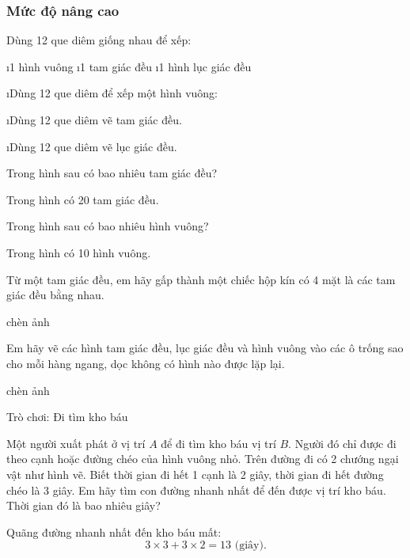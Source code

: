 \subsubsection{Mức độ nâng cao}
\begin{bt}
	Dùng 12 que diêm giống nhau để xếp:
	\begin{enumerate}[a), leftmargin=*]
		\i 1 hình vuông
		\i 1 tam giác đều
		\i 1 hình lục giác đều
	\end{enumerate}
	\begin{loigiaichuong34}
		\begin{enumerate}[a), leftmargin=*]
			\i Dùng 12 que diêm để xếp một hình vuông:
			
			\i Dùng 12 que diêm vẽ tam giác đều.
			
			\i Dùng 12 que diêm vẽ lục giác đều.
		\end{enumerate}
	\end{loigiaichuong34}
\end{bt}
\begin{bt}
	Trong hình sau có bao nhiêu tam giác đều?
	\begin{loigiaichuong34}
		Trong hình có 20 tam giác đều.
	\end{loigiaichuong34}
\end{bt}
\begin{bt}
	Trong hình sau có bao nhiêu hình vuông?
	\begin{loigiaichuong34}
		Trong hình có 10 hình vuông.
	\end{loigiaichuong34}
\end{bt}
\begin{bt}
	Từ một tam giác đều, em hãy gấp thành một chiếc hộp kín có 4 mặt là các tam giác đều bằng nhau.
	\begin{loigiaichuong34}
		chèn ảnh
	\end{loigiaichuong34}
\end{bt} 
\begin{bt}
	Em hãy vẽ các hình tam giác đều, lục giác đều và hình vuông vào các ô trống sao cho mỗi hàng ngang, dọc không có hình nào được lặp lại.
	\begin{loigiaichuong34}
		chèn ảnh
	\end{loigiaichuong34}
\end{bt}
\begin{bt}
	Trò chơi: Đi tìm kho báu
	
	Một người xuất phát ở vị trí $A$ để đi tìm kho báu vị trí $B$. Người đó chỉ được đi theo cạnh hoặc đường chéo của hình vuông nhỏ. Trên đường đi có 2 chướng ngại vật như hình vẽ. Biết thời gian đi hết 1 cạnh là 2 giây, thời gian đi hết đường chéo là 3 giây. Em hãy tìm con đường nhanh nhất để đến được vị trí kho báu. Thời gian đó là bao nhiêu giây? 
	\begin{loigiaichuong34}
		Quãng đường nhanh nhất đến kho báu mất: 
		\[3 \times 3 + 3\times 2 = 13 \text{ (giây).}\]
	\end{loigiaichuong34}
\end{bt}
